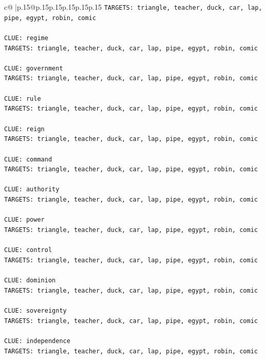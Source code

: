 \documentclass{article}
\begin{document}
{\begin{supertabular}{c@{$\;$}|p{.15\linewidth}@{}p{.15\linewidth}p{.15\linewidth}p{.15\linewidth}p{.15\linewidth}p{.15\linewidth}}
{{{\texttt{TARGETS: triangle, teacher, duck, car, lap, pipe, egypt, robin, comic} \\
\\ 
\texttt{CLUE: regime} \\
\texttt{TARGETS: triangle, teacher, duck, car, lap, pipe, egypt, robin, comic} \\
\\ 
\texttt{CLUE: government} \\
\texttt{TARGETS: triangle, teacher, duck, car, lap, pipe, egypt, robin, comic} \\
\\ 
\texttt{CLUE: rule} \\
\texttt{TARGETS: triangle, teacher, duck, car, lap, pipe, egypt, robin, comic} \\
\\ 
\texttt{CLUE: reign} \\
\texttt{TARGETS: triangle, teacher, duck, car, lap, pipe, egypt, robin, comic} \\
\\ 
\texttt{CLUE: command} \\
\texttt{TARGETS: triangle, teacher, duck, car, lap, pipe, egypt, robin, comic} \\
\\ 
\texttt{CLUE: authority} \\
\texttt{TARGETS: triangle, teacher, duck, car, lap, pipe, egypt, robin, comic} \\
\\ 
\texttt{CLUE: power} \\
\texttt{TARGETS: triangle, teacher, duck, car, lap, pipe, egypt, robin, comic} \\
\\ 
\texttt{CLUE: control} \\
\texttt{TARGETS: triangle, teacher, duck, car, lap, pipe, egypt, robin, comic} \\
\\ 
\texttt{CLUE: dominion} \\
\texttt{TARGETS: triangle, teacher, duck, car, lap, pipe, egypt, robin, comic} \\
\\ 
\texttt{CLUE: sovereignty} \\
\texttt{TARGETS: triangle, teacher, duck, car, lap, pipe, egypt, robin, comic} \\
\\ 
\texttt{CLUE: independence} \\
\texttt{TARGETS: triangle, teacher, duck, car, lap, pipe, egypt, robin, comic} \\
}}}
\end{supertabular}}
\end{document}
